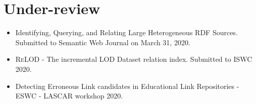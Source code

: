 \section{Under-review}

\begin{itemize}
    \item Identifying, Querying, and Relating Large Heterogeneous RDF Sources. Submitted to Semantic Web Journal on March 31, 2020.
    \item \textsc{ReLOD} - The incremental LOD Dataset relation index. Submitted to ISWC 2020.
    \item Detecting Erroneous Link candidates in Educational Link Repositories - ESWC - LASCAR workshop 2020.
\end{itemize}